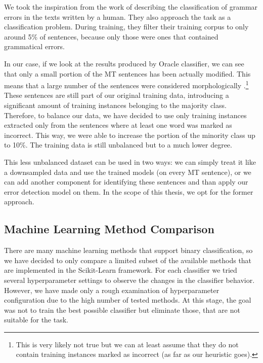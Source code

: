 We took the inspiration from the work of \citet{2013_Jia_CoNLL_GrammaticalError} describing the classification of grammar errors in the texts
written by a human. They also approach the task as a classification
problem. During training, they filter their training corpus to only around 5\% of
sentences, because only those were ones that contained grammatical errors.

In our case, if we look at the results produced by Oracle classifier, we can see that
only a small portion of the MT sentences has been actually modified. This means that a large number of the sentences
were considered morphologically .\footnote{This is very likely not true but we can at least assume
that they do not contain training instances marked as incorrect (as far as our heuristic goes).}
These sentences are still part of our original training data, introducing a significant amount of training
instances belonging to the majority class.
Therefore, to balance our data, we have decided to use only training
instances extracted only from the sentences where at least one word was marked as incorrect. This way, we were
able to increase the portion of the minority class up to 10\%. The training data is still unbalanced
but to a much lower degree.

This less unbalanced dataset can be used in two ways: we can simply treat
it like a downsampled data and use the trained models  (on every MT sentence),
or we can add another component for identifying these  sentences
and than apply our error detection model on them. In the scope of this thesis, we opt for the former
approach.



\subsection{Machine Learning Method Comparison}

There are many machine learning methods that support binary classification, so we have
decided to only compare a limited subset of the available methods that are implemented
in the Scikit-Learn framework. For each classifier we tried several hyperparameter
settings to observe the changes in the classifier behavior. However, we have made only
a rough examination of hyperparameter configuration due to the high number of tested
methods. At this stage, the goal was not to train the best possible classifier but
eliminate those, that are not suitable for the task.

